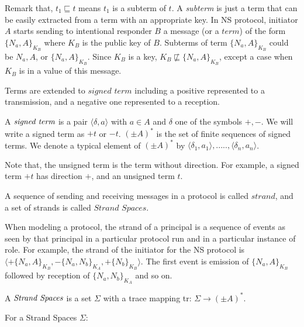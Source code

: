 Remark that, $t_1\sqsubseteq t$ means $t_1$ is a subterm of $t$. A \textit{subterm} is just a term that can be easily extracted from a term with an appropriate key. In NS protocol, initiator $A$ starts sending to intentional responder $B$ a message (or a $term$) of the form $\{N_a,A\}_{K_B}$ where $K_B$ is the public key of $B$. Subterms of term $\{N_a,A\}_{K_B}$ could be $N_a, A$, or $\{N_a,A\}_{K_B}$. Since $K_B$ is a key, $K_B \not\sqsubseteq \{N_a,A\}_{K_B}$, except a case when $K_B$ is in a value of this message. 

Terms are extended to $\textit{signed term}$ including a positive represented to a transmission, and a negative one represented to a reception. 

\begin{Definition} A $\emph{signed term}$ is a pair $\langle\delta,a\rangle$ with $a \in A$ and $\delta$ one of the symbols $+,-$. We will write a signed term as $+t$ or $-t$. $(\pm A)^*$ is the set of finite sequences of signed terms. We denote a typical element of $(\pm A)^*$ by $\langle \delta_1,a_1\rangle,.....,\langle\delta_n,a_n\rangle$.
\end{Definition}

Note that, the unsigned term is the term without direction. For example, a signed term $+t$ has direction $+$, and an unsigned term $t$. 

A sequence of sending and receiving messages in a protocol is called $strand$, and a set of strands is called $\textit{Strand Spaces}$. 

When modeling a protocol, the strand of a principal is a sequence of events as seen by that principal in a particular protocol run and in a particular instance of role. For example, the strand of the initiator for the NS protocol is $\langle+\{N_a,A\}_{K_B}, -\{N_a,N_b\}_{K_A},+\{N_b\}_{K_B} \rangle$. The first event is emission of $\{N_a,A\}_{K_B}$ followed by reception of $\{N_a,N_b\}_{K_A}$ and so on. 

\begin{Definition}
A $\emph{Strand Spaces}$ is a set $\Sigma$ with a trace mapping tr: $\Sigma \rightarrow (\pm A)^*$.
\end{Definition}

For a Strand Spaces $\Sigma$:

